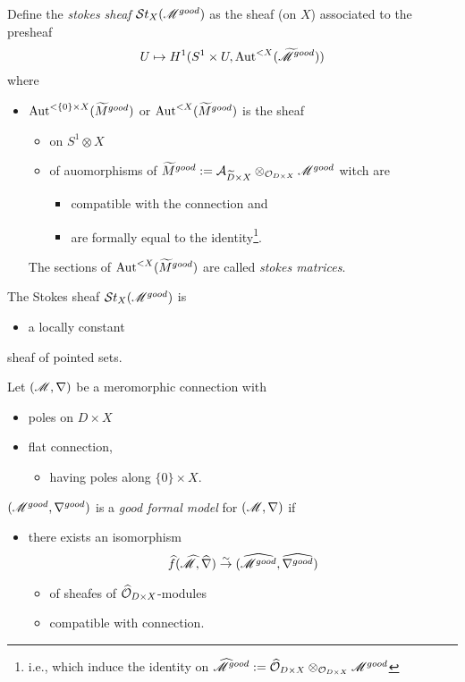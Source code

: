 \begin{defn}
  Define the \emph{stokes sheaf} $\mathcal{S}{}t_X(\mathscr{M}^{good})$ as the sheaf (on $X$)
  associated to the presheaf
  \[
    U\mapsto H^1(S^1\times U,\operatorname{Aut}^{<X}(\widetilde {\mathscr{M}}^{good}) )
  \]
  where
  \begin{itemize}
    \item $\operatorname{Aut}^{<\{0\}\times X}(\widetilde M^{good})$ or
      $\operatorname{Aut}^{<X}(\widetilde M^{good})$ is the sheaf
      \begin{itemize}
        \item on $S^1\otimes X$
        \item of auomorphisms of $\widetilde M^{good}:=\mathcal{A}_{\widetilde D\times
          X}\otimes_{\mathcal{O}_{D\times X}}\mathscr{M}^{good}$
          witch are
          \begin{itemize}
            \item compatible with the connection and
            \item are formally equal to the identity\footnote{i.e., which
              induce the identity on $\widehat {\mathscr{M}}^{good}:=\widehat {\mathcal{O}}_{D\times
              X}\otimes_{\mathcal{O}_{D\times X}}\mathscr{M}^{good}$}.
          \end{itemize}
      \end{itemize}
      The sections of $\operatorname{Aut}^{<X}(\widetilde M^{good})$ are called \emph{stokes
      matrices}.
  \end{itemize}
\end{defn}
\begin{thm}
  The Stokes sheaf $\mathcal{S}{}t_X(\mathscr{M}^{good})$ is
  \begin{itemize}
    \item a locally constant
  \end{itemize}
  sheaf of pointed sets.
\end{thm}
Let $(\mathscr{M},\nabla)$ be a meromorphic connection with
\begin{itemize}
  \item poles on $D\times X$ 
  \item flat connection, 
    \begin{itemize}
      \item having poles along $\{0\}\times X$.
    \end{itemize}
\end{itemize}
\begin{defn}
  $(\mathscr{M}^{good},\nabla^{good})$ is a \emph{good formal model} for
  $(\mathscr{M},\nabla)$ if
  \begin{itemize}
    \item there exists an isomorphism 
      \[
        \widehat f(\widehat{\mathscr{M}},\widehat\nabla)\overset{\sim}{\to}
        (\widehat{\mathscr{M}^{good}},\widehat{\nabla^{good}})
      \]
      \begin{itemize}
        \item of sheafes of $\widehat{\mathcal{O}}_{D\times X}$-modules
        \item compatible with connection.
      \end{itemize}
  \end{itemize}
\end{defn}
